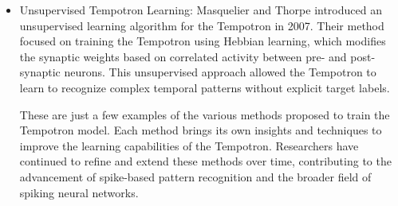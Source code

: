 \begin{itemize}
    \item Unsupervised Tempotron Learning: Masquelier and Thorpe \cite{masquelier2007unsupervised} introduced an unsupervised learning algorithm for the Tempotron in 2007. Their method focused on training the Tempotron using Hebbian learning, which modifies the synaptic weights based on correlated activity between pre- and post-synaptic neurons. This unsupervised approach allowed the Tempotron to learn to recognize complex temporal patterns without explicit target labels.

These are just a few examples of the various methods proposed to train the Tempotron model. Each method brings its own insights and techniques to improve the learning capabilities of the Tempotron. Researchers have continued to refine and extend these methods over time, contributing to the advancement of spike-based pattern recognition and the broader field of spiking neural networks.

\end{itemize}
